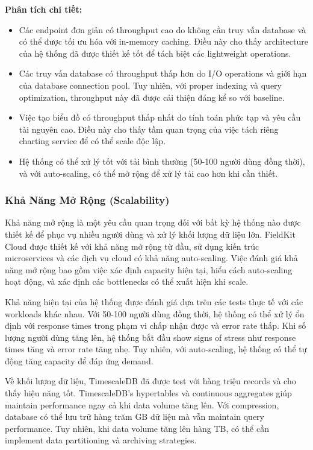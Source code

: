 \textbf{Phân tích chi tiết:}
\begin{itemize}
    \item Các endpoint đơn giản có throughput cao do không cần truy vấn database và có thể được tối ưu hóa với in-memory caching. Điều này cho thấy architecture của hệ thống đã được thiết kế tốt để tách biệt các lightweight operations.
    
    \item Các truy vấn database có throughput thấp hơn do I/O operations và giới hạn của database connection pool. Tuy nhiên, với proper indexing và query optimization, throughput này đã được cải thiện đáng kể so với baseline.
    
    \item Việc tạo biểu đồ có throughput thấp nhất do tính toán phức tạp và yêu cầu tài nguyên cao. Điều này cho thấy tầm quan trọng của việc tách riêng charting service để có thể scale độc lập.
    
    \item Hệ thống có thể xử lý tốt với tải bình thường (50-100 người dùng đồng thời), và với auto-scaling, có thể mở rộng để xử lý tải cao hơn khi cần thiết.
\end{itemize}

\subsubsection{Khả Năng Mở Rộng (Scalability)}

Khả năng mở rộng là một yêu cầu quan trọng đối với bất kỳ hệ thống nào được thiết kế để phục vụ nhiều người dùng và xử lý khối lượng dữ liệu lớn. FieldKit Cloud được thiết kế với khả năng mở rộng từ đầu, sử dụng kiến trúc microservices và các dịch vụ cloud có khả năng auto-scaling. Việc đánh giá khả năng mở rộng bao gồm việc xác định capacity hiện tại, hiểu cách auto-scaling hoạt động, và xác định các bottlenecks có thể xuất hiện khi scale.

Khả năng hiện tại của hệ thống được đánh giá dựa trên các tests thực tế với các workloads khác nhau. Với 50-100 người dùng đồng thời, hệ thống có thể xử lý ổn định với response times trong phạm vi chấp nhận được và error rate thấp. Khi số lượng người dùng tăng lên, hệ thống bắt đầu show signs of stress như response times tăng và error rate tăng nhẹ. Tuy nhiên, với auto-scaling, hệ thống có thể tự động tăng capacity để đáp ứng demand.

Về khối lượng dữ liệu, TimescaleDB đã được test với hàng triệu records và cho thấy hiệu năng tốt. TimescaleDB's hypertables và continuous aggregates giúp maintain performance ngay cả khi data volume tăng lên. Với compression, database có thể lưu trữ hàng trăm GB dữ liệu mà vẫn maintain query performance. Tuy nhiên, khi data volume tăng lên hàng TB, có thể cần implement data partitioning và archiving strategies.

